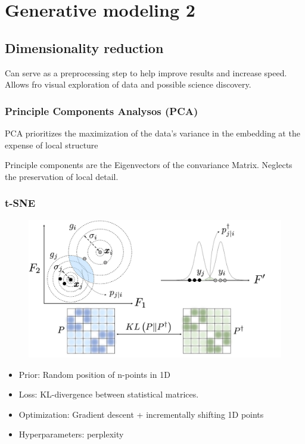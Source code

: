 \section{Generative modeling 2}
\subsection{Dimensionality reduction}
Can serve as a preprocessing step to help improve results and increase speed.
Allows fro visual exploration of data and possible science discovery.
\subsubsection{Principle Components Analysos (PCA)}
PCA prioritizes the maximization of the data's variance in the embedding at the expense of local structure

Principle components are the Eigenvectors of the convariance Matrix.
Neglects the preservation of local detail.
\subsubsection{t-SNE}
\begin{figure}[!h]
    \includegraphics[width = \columnwidth]{figures/GenAI2/tSNETheory.png}
\end{figure}
\begin{itemize}
    \item Prior: Random position of n-points in 1D
    \item Loss: KL-divergence between statistical matrices.
    \item Optimization: Gradient descent + incrementally shifting 1D points
    \item Hyperparameters: perplexity
\end{itemize}

